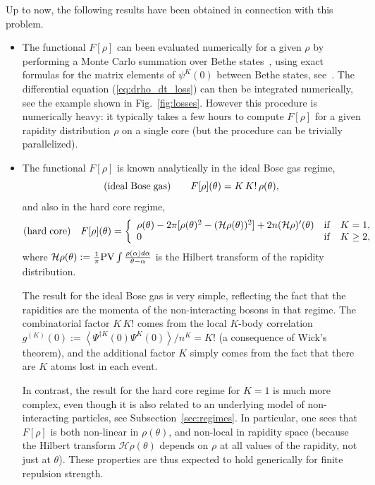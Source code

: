 \documentclass[onecolumn,amsfonts,showpacs,superscriptaddress]{revtex4-1}
\begin{document}
\vspace{0.5cm}
Up to now, the following results have been obtained in connection with this problem.
\begin{itemize}
    \item The functional $F[\rho]$ can been evaluated numerically for a given $\rho$ by performing a Monte Carlo summation over Bethe states~\citep{bouchoule_effect_2020}, using exact formulas for the matrix elements of $\psi^K(0)$ between Bethe states, see~\citep{pozsgay2011mean,piroli2015exact}. The differential equation (\ref{eq:drho_dt_loss}) can then be integrated numerically, see the example shown in Fig.~\ref{fig:losses}. However this procedure is numerically heavy: it typically takes a few hours to compute $F[\rho]$ for a given rapidity distribution $\rho$ on a single core (but the procedure can be trivially parallelized). 
    
    \item The functional $F[\rho]$ is known analytically in the ideal Bose gas regime,
    \begin{equation}
        ({\rm ideal \; Bose \; gas}) \qquad  F[\rho](\theta) = K  \, K!  \, \rho(\theta) ,
    \end{equation}
    and also in the hard core regime,
    \begin{equation}
        ({\rm hard \; core}) \quad  F[\rho](\theta) = \left\{     \begin{array}{lll}
                \rho(\theta) - 2\pi [ \rho(\theta)^2 - (\mathcal{H} \rho(\theta))^2  ] + 2 n (\mathcal{H} \rho)'(\theta) & {\rm if} & K=1 , \\
                0 &{\rm if}& K \geq 2 ,       
            \end{array}
        \right.
    \end{equation}
    where $\mathcal{H} \rho(\theta) := \frac{1}{\pi} {\rm PV} \int \frac{\rho(\alpha) d\alpha}{\theta - \alpha}$ is the Hilbert transform of the rapidity distribution.
    
    The result for the ideal Bose gas is very simple, reflecting the fact that the rapidities are the momenta of the non-interacting bosons in that regime. The combinatorial factor $K \, K!$ comes from the local $K$-body correlation  $g^{(K)}(0) := \left< \Psi^{\dagger K}(0)\Psi^K(0) \right>/n^K = K!$ (a consequence of Wick's theorem), and the additional factor $K$ simply comes from the fact that there are $K$ atoms lost in each event.
    
    In contrast, the result for the hard core regime for $K=1$ is much more complex, even though it is also related to an underlying model of non-interacting particles, see Subsection~\ref{sec:regimes}. In particular, one sees that $F[\rho]$ is both non-linear in $\rho(\theta)$, and non-local in rapidity space (because the Hilbert transform $\mathcal{H} \rho(\theta)$ depends on $\rho$ at all values of the rapidity, not just at $\theta$). These properties are thus expected to hold generically for finite repulsion strength.
    

\end{itemize}
\end{document}
